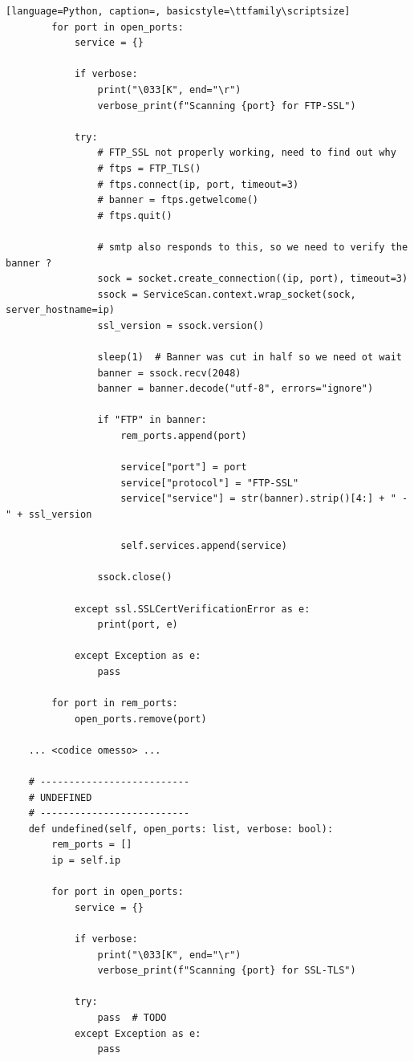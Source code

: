 \documentclass[12pt]{report}
\begin{document}
\begin{lstlisting}[language=Python, caption=, basicstyle=\ttfamily\scriptsize]
        for port in open_ports:
            service = {}

            if verbose:
                print("\033[K", end="\r")
                verbose_print(f"Scanning {port} for FTP-SSL")

            try:
                # FTP_SSL not properly working, need to find out why
                # ftps = FTP_TLS()
                # ftps.connect(ip, port, timeout=3)
                # banner = ftps.getwelcome()
                # ftps.quit()

                # smtp also responds to this, so we need to verify the banner ?
                sock = socket.create_connection((ip, port), timeout=3)
                ssock = ServiceScan.context.wrap_socket(sock, server_hostname=ip)
                ssl_version = ssock.version()

                sleep(1)  # Banner was cut in half so we need ot wait
                banner = ssock.recv(2048)
                banner = banner.decode("utf-8", errors="ignore")

                if "FTP" in banner:
                    rem_ports.append(port)

                    service["port"] = port
                    service["protocol"] = "FTP-SSL"
                    service["service"] = str(banner).strip()[4:] + " - " + ssl_version

                    self.services.append(service)

                ssock.close()

            except ssl.SSLCertVerificationError as e:
                print(port, e)

            except Exception as e:
                pass

        for port in rem_ports:
            open_ports.remove(port)

    ... <codice omesso> ...
    
    # --------------------------
    # UNDEFINED
    # --------------------------
    def undefined(self, open_ports: list, verbose: bool):
        rem_ports = []
        ip = self.ip

        for port in open_ports:
            service = {}

            if verbose:
                print("\033[K", end="\r")
                verbose_print(f"Scanning {port} for SSL-TLS")

            try:
                pass  # TODO
            except Exception as e:
                pass


\end{lstlisting}
\end{document}
